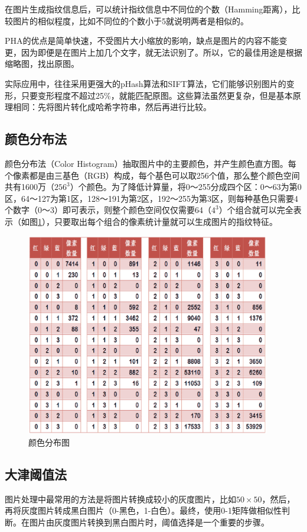 在图片生成指纹信息后，可以统计指纹信息中不同位的个数（Hamming距离），比较图片的相似程度，比如不同位的个数小于5就说明两者是相似的。

PHA的优点是简单快速，不受图片大小缩放的影响，缺点是图片的内容不能变更，因为即便是在图片上加几个文字，就无法识别了。所以，它的最佳用途是根据缩略图，找出原图。

实际应用中，往往采用更强大的pHash算法和SIFT算法，它们能够识别图片的变形，只要变形程度不超过25\%，就能匹配原图。这些算法虽然更复杂，但是基本原理相同：先将图片转化成哈希字符串，然后再进行比较。

\subsection{颜色分布法}
颜色分布法（Color Histogram）抽取图片中的主要颜色，并产生颜色直方图。每个像素都是由三基色（RGB）构成，每个基色可以取256个值，那么整个颜色空间共有1600万（$256^3$）个颜色。为了降低计算量，将0～255分成四个区：0～63为第0区，64～127为第1区，128～191为第2区，192～255为第3区，则每种基色只需要4个数字（0～3）即可表示，则整个颜色空间仅仅需要64（$4^3$）个组合就可以完全表示（如图\ref{fig:colordistribution}），只要取出每个组合的像素统计量就可以生成图片的指纹特征。
\begin{figure}[htbp]
  \centering
  \includegraphics[width=0.95\textwidth]{figures/colordistribution.eps}
  \caption{颜色分布图}\label{fig:colordistribution}
\end{figure}

\subsection{大津阈值法}
图片处理中最常用的方法是将图片转换成较小的灰度图片，比如$50\times 50$，然后，再将灰度图片转成黑白图片（0-黑色，1-白色）。最终，使用0-1矩阵做相似性判断。在图片由灰度图片转换到黑白图片时，阈值选择是一个重要的步骤。

